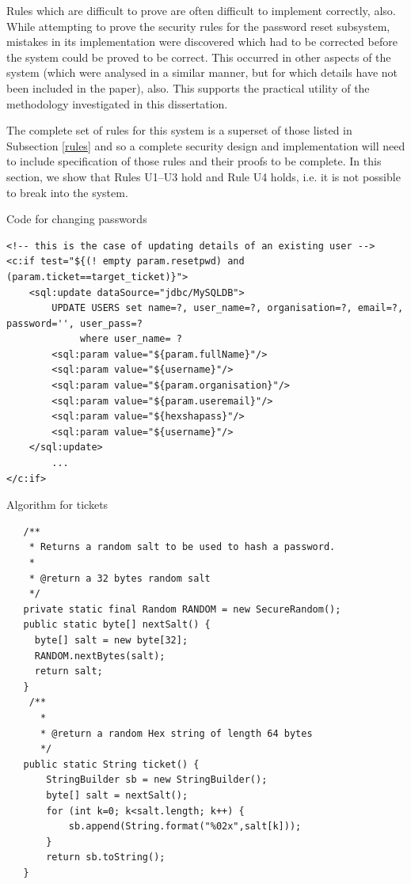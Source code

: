 Rules which are difficult to prove are often difficult to implement correctly, also. While attempting to prove the security rules for the password reset subsystem, mistakes in its implementation were discovered which had to be corrected before the system could be proved to be correct. This occurred in other aspects of the system (which were analysed in a similar manner, but for which details have not been included in the paper), also. This supports the practical utility of the methodology investigated in this dissertation.

The complete set of rules for this system is a superset of those listed in Subsection \ref{rules} and so a complete security design and implementation will need to include specification of those rules and their proofs to be complete.  In this section, we show that Rules U1--U3 hold and Rule U4 holds, i.e. it is not possible to break into the system.

\begin{listing}
\caption{Code for changing passwords}\label{ticketcode}
{\footnotesize
\begin{verbatim}
<!-- this is the case of updating details of an existing user -->
<c:if test="${(! empty param.resetpwd) and (param.ticket==target_ticket)}">
    <sql:update dataSource="jdbc/MySQLDB">
        UPDATE USERS set name=?, user_name=?, organisation=?, email=?, password='', user_pass=?
             where user_name= ?
        <sql:param value="${param.fullName}"/>
        <sql:param value="${username}"/>
        <sql:param value="${param.organisation}"/>
        <sql:param value="${param.useremail}"/>
        <sql:param value="${hexshapass}"/>
        <sql:param value="${username}"/>
    </sql:update>
		... 
</c:if>
\end{verbatim}
}
\end{listing}
    
\begin{listing}
\caption{Algorithm for tickets}\label{ticketalg}
{\footnotesize
\vspace{5mm}
\begin{verbatim}
   /**
    * Returns a random salt to be used to hash a password.
    *
    * @return a 32 bytes random salt
    */
   private static final Random RANDOM = new SecureRandom();
   public static byte[] nextSalt() {
     byte[] salt = new byte[32];
     RANDOM.nextBytes(salt);
     return salt;
   }
    /**
      *
      * @return a random Hex string of length 64 bytes
      */
   public static String ticket() {
       StringBuilder sb = new StringBuilder();
       byte[] salt = nextSalt();
       for (int k=0; k<salt.length; k++) {
           sb.append(String.format("%02x",salt[k]));
       }
       return sb.toString();
   }
\end{verbatim}
}
\end{listing}

